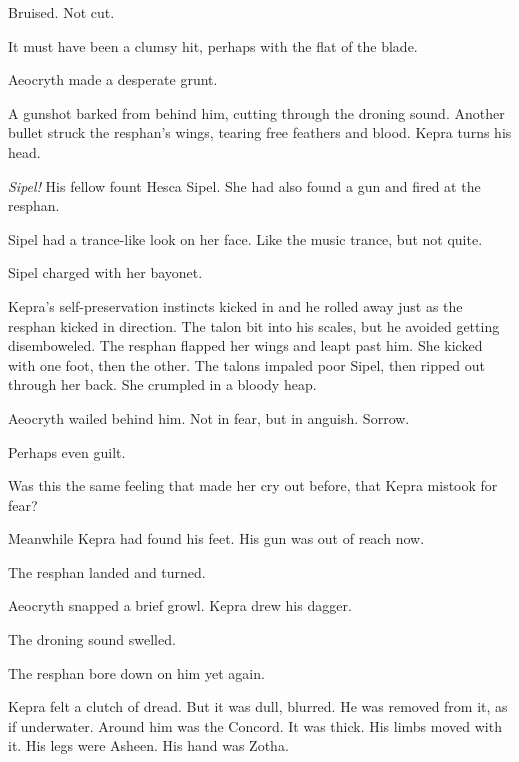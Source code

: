 \documentclass
  [a4paper,
   12pt,
   oneside
  ]%
  {article}
\begin{document}
Bruised. Not cut. 

It must have been a clumsy hit, perhaps with the flat of the blade. 

Aeocryth made a desperate grunt.

A gunshot barked from behind him, cutting through the droning sound. 
Another bullet struck the resphan’s wings, tearing free feathers and blood. 
Kepra turns his head. 

\emph{Sipel!} His fellow fount Hesca Sipel. She had also found a gun and fired at the resphan.

Sipel had a trance-like look on her face.
Like the music trance, but not quite.

Sipel charged with her bayonet. 

Kepra's self-preservation instincts kicked in and he rolled away just as the resphan kicked in direction. 
The talon bit into his scales, but he avoided getting disemboweled.
The resphan flapped her wings and leapt past him. 
She kicked with one foot, then the other.
The talons impaled poor Sipel, then ripped out through her back. 
She crumpled in a bloody heap.

Aeocryth wailed behind him. 
Not in fear, but in anguish.
Sorrow. 

Perhaps even guilt.

Was this the same feeling that made her cry out before, that Kepra mistook for fear?

Meanwhile Kepra had found his feet. 
His gun was out of reach now. 

The resphan landed and turned. 

Aeocryth snapped a brief growl.
Kepra drew his dagger. 

The droning sound swelled.

The resphan bore down on him yet again.

Kepra felt a clutch of dread.
But it was dull, blurred. He was removed from it, as if underwater. 
Around him was the Concord. 
It was thick. 
His limbs moved with it. 
His legs were Asheen. 
His hand was Zotha. 
\end{document}
